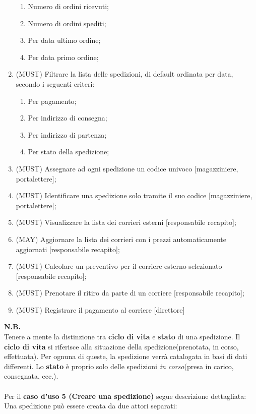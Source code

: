 \begin{enumerate}
\begin{enumerate}
      \item{Numero di ordini ricevuti};
      \item{Numero di ordini spediti};
      \item{Per data ultimo ordine};
      \item{Per data primo ordine};
    \end{enumerate}
  \item{(MUST)} Filtrare la lista delle spedizioni, di default ordinata per data, secondo i seguenti criteri:
    \begin{enumerate}
      \item{Per pagamento};
      \item{Per indirizzo di consegna};
      \item{Per indirizzo di partenza};
      \item{Per stato della spedizione};
    \end{enumerate}
  \item{(MUST)} Assegnare ad ogni spedizione un codice univoco [magazziniere, portalettere];
  \item{(MUST)} Identificare una spedizione solo tramite il suo codice [magazziniere, portalettere];
  \item{(MUST)} Visualizzare la lista dei corrieri esterni [responsabile recapito];
  \item{(MAY)}  Aggiornare la lista dei corrieri con i prezzi automaticamente aggiornati [responsabile recapito];
  \item{(MUST)} Calcolare un preventivo per il corriere esterno selezionato [responsabile recapito];
  \item{(MUST)} Prenotare il ritiro da parte di un corriere [responsabile recapito];
  \item{(MUST)} Registrare il pagamento al corriere [direttore]
\end{enumerate}
\textbf{N.B.} \\
Tenere a mente la distinzione tra \textbf{ciclo di vita} e \textbf{stato} di una spedizione. Il \textbf{ciclo di vita} si riferisce
alla situazione della spedizione(prenotata, in corso, effettuata). Per ognuna di queste, la spedizione verrà catalogata in basi di dati differenti.
Lo \textbf{stato} è proprio solo delle spedizioni \textit{in corso}(presa in carico, consegnata, ecc.).
\\ \\
Per il \textbf{caso d'uso 5 (Creare una spedizione)} segue descrizione dettagliata: \\
Una spedizione può essere creata da due attori separati:
